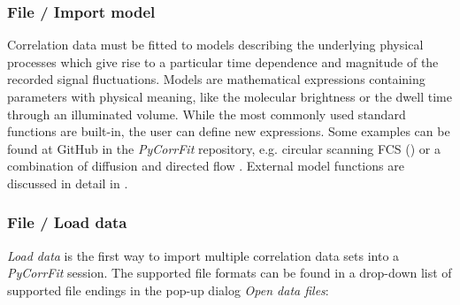 \subsubsection{File / Import model}
\label{sec:menub.filem.impor}
Correlation data must be fitted to models describing the underlying physical processes which give rise to a particular time dependence and magnitude of the recorded signal fluctuations. Models are mathematical expressions containing parameters with physical meaning, like the molecular brightness or the dwell time through an illuminated volume. While the most commonly used standard functions are built-in, the user can define new expressions.
Some examples can be found at GitHub in the \textit{PyCorrFit} repository, e.g. circular scanning FCS \cite{Petrasek2008} () or a combination of diffusion and directed flow \cite{Brinkmeier1999}. External model functions are discussed in detail in .


\subsubsection{File / Load data}
\label{sec:menub.filem.loadd}
\textit{Load data }is the first way to import multiple correlation data sets into a \textit{PyCorrFit} session. The supported file formats can be found in a drop-down list of supported file endings in the pop-up dialog \textit{Open data files}:

